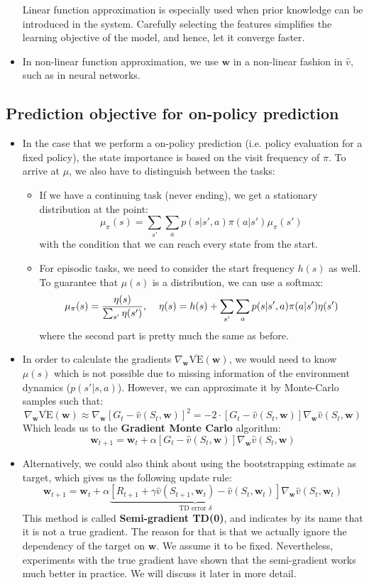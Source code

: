 \begin{itemize}
	Linear function approximation is especially used when prior knowledge can be introduced in the system. Carefully selecting the features simplifies the learning objective of the model, and hence, let it converge faster.
	
	\item In non-linear function approximation, we use $\bm{w}$ in a non-linear fashion in $\hat{v}$, such as in neural networks.
	
\end{itemize}
\subsection{Prediction objective for on-policy prediction}
\begin{itemize}
	\item In the case that we perform a on-policy prediction (i.e. policy evaluation for a fixed policy), the state importance is based on the visit frequency of $\pi$. To arrive at $\mu$, we also have to distinguish between the tasks:
	\begin{itemize}
		\item If we have a continuing task (never ending), we get a stationary distribution at the point:
		$$\mu_{\pi}(s)=\sum_{s'}\sum_{a}p(s|s',a)\pi(a|s')\mu_{\pi}(s')$$
		with the condition that we can reach every state from the start.
		\item For episodic tasks, we need to consider the start frequency $h(s)$ as well. To guarantee that $\mu(s)$ is a distribution, we can use a softmax:
		$$\mu_{\pi}(s)=\frac{\eta(s)}{\sum_{s'}\eta(s')}, \hspace{4mm}\eta(s)=h(s)+\sum_{s'}\sum_a p(s|s',a)\pi(a|s')\eta(s')$$
		where the second part is pretty much the same as before.
	\end{itemize} 
	\item In order to calculate the gradients $\nabla_{\bm{w}}\overline{\text{VE}}(\bm{w})$, we would need to know $\mu(s)$ which is not possible due to missing information of the environment dynamics ($p(s'|s,a)$). However, we can approximate it by Monte-Carlo samples such that:
	$$\nabla_{\bm{w}}\overline{\text{VE}}(\bm{w})\approx \nabla_{\bm{w}}\left[G_t - \hat{v}(S_t,\bm{w})\right]^2 = -2\cdot \left[G_t - \hat{v}(S_t,\bm{w})\right] \nabla_{\bm{w}}\hat{v}(S_t,\bm{w})$$
	Which leads us to the \textbf{Gradient Monte Carlo} algorithm:
	$$\bm{w}_{t+1}=\bm{w}_{t}+\alpha \left[G_t - \hat{v}(S_t,\bm{w})\right] \nabla_{\bm{w}}\hat{v}(S_t,\bm{w})$$
	\item Alternatively, we could also think about using the bootstrapping estimate as target, which gives us the following update rule:
	$$\bm{w}_{t+1}=\bm{w}_t + \alpha\underbrace{\left[R_{t+1} + \gamma\hat{v}(S_{t+1},\bm{w}_t) - \hat{v}(S_t,\bm{w}_t)\right]}_{\text{TD error }\delta}\nabla_{\bm{w}}\hat{v}(S_t,\bm{w}_t)$$  
	This method is called \textbf{Semi-gradient TD(0)}, and indicates by its name that it is not a true gradient. The reason for that is that we actually ignore the dependency of the target on $\bm{w}$. We assume it to be fixed.  Nevertheless, experiments with the true gradient have shown that the semi-gradient works much better in practice. We will discuss it later in more detail.
	

\end{itemize}

